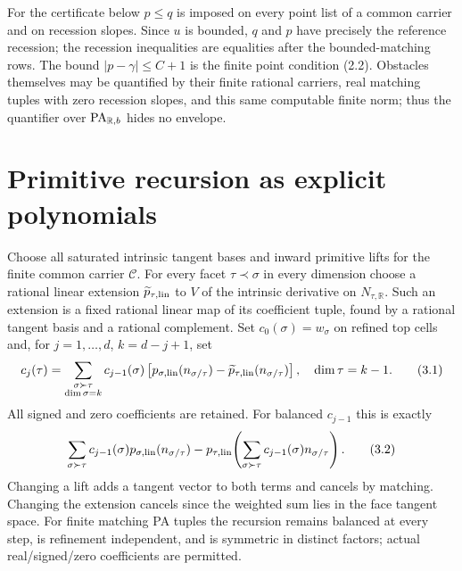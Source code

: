 \documentclass[11pt]{article}
\newcommand{\R}{\mathbb R}\newcommand{\Q}{\mathbb Q}\newcommand{\Z}{\mathbb Z}
\begin{document}
For the certificate below $p\leq q$ is imposed on every point list of a common carrier and on recession slopes. Since $u$ is bounded, $q$ and $p$ have precisely the reference recession; the recession inequalities are equalities after the bounded-matching rows. The bound $|p-\gamma|\leq C+1$ is the finite point condition (2.2). Obstacles themselves may be quantified by their finite rational carriers, real matching tuples with zero recession slopes, and this same computable finite norm; thus the quantifier over $\PA_{\R,b}$ hides no envelope.

\section{Primitive recursion as explicit polynomials}
Choose all saturated intrinsic tangent bases and inward primitive lifts for the finite common carrier $\mathcal C$. For every facet $\tau\prec\sigma$ in every dimension choose a rational linear extension $\widetilde p_{\tau,\rm lin}$ to $V$ of the intrinsic derivative on $N_{\tau,\R}$. Such an extension is a fixed rational linear map of its coefficient tuple, found by a rational tangent basis and a rational complement. Set $c_0(\sigma)=w_\sigma$ on refined top cells and, for $j=1,\ldots,d$, $k=d-j+1$, set
\[
 c_j(\tau)=\sum_{\substack{\sigma\succ\tau\\\dim\sigma=k}}
 c_{j-1}(\sigma)
 \left[p_{\sigma,\rm lin}(n_{\sigma/\tau})-
       \widetilde p_{\tau,\rm lin}(n_{\sigma/\tau})\right],\quad
 \dim\tau=k-1.                                                       \tag{3.1}
\]
All signed and zero coefficients are retained. For balanced $c_{j-1}$ this is exactly
\[
 \sum_{\sigma\succ\tau}c_{j-1}(\sigma)p_{\sigma,\rm lin}(n_{\sigma/\tau})
 -p_{\tau,\rm lin}\!\left(\sum_{\sigma\succ\tau}
                          c_{j-1}(\sigma)n_{\sigma/\tau}\right).       \tag{3.2}
\]
Changing a lift adds a tangent vector to both terms and cancels by matching. Changing the extension cancels since the weighted sum lies in the face tangent space. For finite matching PA tuples the recursion remains balanced at every step, is refinement independent, and is symmetric in distinct factors; actual real/signed/zero coefficients are permitted.
\end{document}
